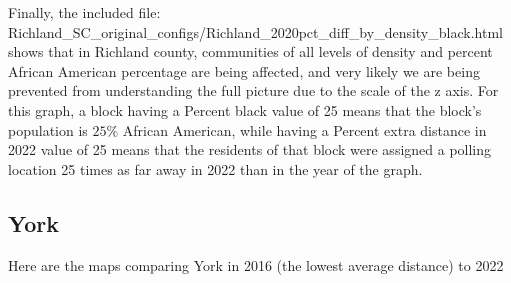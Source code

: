\documentclass[11pt]{article}
\theoremstyle{remark}
\theoremstyle{definition}
\begin{document}
Finally, the included file: \textrm{Richland\_SC\_original\_configs/Richland\_2020pct\_diff\_by\_density\_black.html} shows that in Richland county, communities of all levels of density and percent African American percentage are being affected, and very likely we are being prevented from understanding the full picture due to the scale of the z axis. For this graph, a block having a Percent black value of 25 means that the block's population is $25\%$ African American, while having a Percent extra distance in 2022 value of 25 means that the residents of that block were assigned a polling location 25 times as far away in 2022 than in the year of the graph.

\pagebreak

\subsection{York}
Here are the maps comparing York in 2016 (the lowest average distance) to 2022
\end{document}
